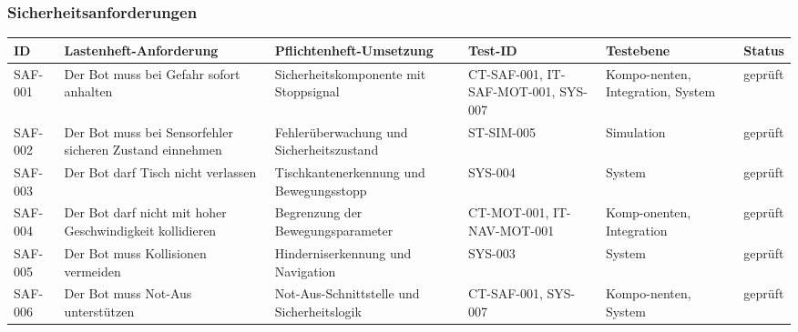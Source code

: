 \subsubsection{Sicherheitsanforderungen}\label{sicherheitsanforderungen}

\begin{longtable}[]{@{}
  >{\raggedright\arraybackslash}p{}
  >{\raggedright\arraybackslash}p{}
  >{\raggedright\arraybackslash}p{}
  >{\raggedright\arraybackslash}p{}
  >{\raggedright\arraybackslash}p{}
  >{\raggedright\arraybackslash}p{}@{}}
\toprule\noalign{}
\begin{minipage}[b]{\linewidth}\raggedright
ID
\end{minipage} & \begin{minipage}[b]{\linewidth}\raggedright
Lastenheft-Anforderung
\end{minipage} & \begin{minipage}[b]{\linewidth}\raggedright
Pflichtenheft-Umsetzung
\end{minipage} & \begin{minipage}[b]{\linewidth}\raggedright
Test-ID
\end{minipage} & \begin{minipage}[b]{\linewidth}\raggedright
Testebene
\end{minipage} & \begin{minipage}[b]{\linewidth}\raggedright
Status
\end{minipage} \\
\midrule\noalign{}
\endhead
\bottomrule\noalign{}
\endlastfoot
SAF-001 & Der Bot muss bei Gefahr sofort anhalten &
Sicherheitskomponente mit Stoppsignal & CT-SAF-001, IT-SAF-MOT-001,
SYS-007 & Kompo-nenten, Integration, System & geprüft \\
SAF-002 & Der Bot muss bei Sensorfehler sicheren Zustand einnehmen &
Fehlerüberwachung und Sicherheitszustand & ST-SIM-005 & Simulation &
geprüft \\
SAF-003 & Der Bot darf Tisch nicht verlassen & Tischkantenerkennung und
Bewegungsstopp & SYS-004 & System & geprüft \\
SAF-004 & Der Bot darf nicht mit hoher Geschwindigkeit kollidieren &
Begrenzung der Bewegungsparameter & CT-MOT-001, IT-NAV-MOT-001 &
Komp-onenten, Integration & geprüft \\
SAF-005 & Der Bot muss Kollisionen vermeiden & Hinderniserkennung und
Navigation & SYS-003 & System & geprüft \\
SAF-006 & Der Bot muss Not-Aus unterstützen & Not-Aus-Schnittstelle und
Sicherheitslogik & CT-SAF-001, SYS-007 & Kompo-nenten, System &
geprüft \\
\end{longtable}

